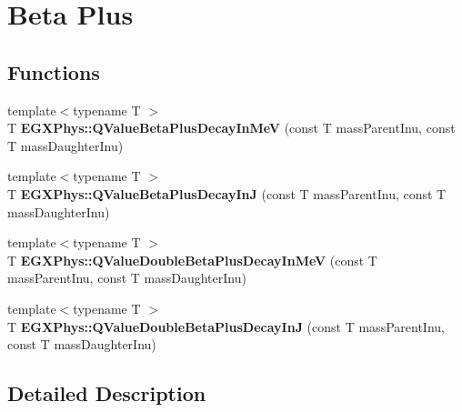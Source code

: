 \hypertarget{group___e_g_x_phys-_q_value-_beta_plus}{}\section{Beta Plus}
\label{group___e_g_x_phys-_q_value-_beta_plus}
\subsection*{Functions}
\begin{DoxyCompactItemize}
\item 
\mbox{\label{group___e_g_x_phys-_q_value-_beta_plus_ga3c4f7ec8e7c44d01d3aee6447a5ab443}} 
{\footnotesize template$<$typename T $>$ }\\T {\bfseries E\+G\+X\+Phys\+::\+Q\+Value\+Beta\+Plus\+Decay\+In\+MeV} (const T mass\+Parent\+Inu, const T mass\+Daughter\+Inu)
\item 
\mbox{\label{group___e_g_x_phys-_q_value-_beta_plus_gaaee51753f077c9fe05188aa5b24f642e}} 
{\footnotesize template$<$typename T $>$ }\\T {\bfseries E\+G\+X\+Phys\+::\+Q\+Value\+Beta\+Plus\+Decay\+InJ} (const T mass\+Parent\+Inu, const T mass\+Daughter\+Inu)
\item 
\mbox{\label{group___e_g_x_phys-_q_value-_beta_plus_gab78be314eac63ddbce441b4c8b22b47d}} 
{\footnotesize template$<$typename T $>$ }\\T {\bfseries E\+G\+X\+Phys\+::\+Q\+Value\+Double\+Beta\+Plus\+Decay\+In\+MeV} (const T mass\+Parent\+Inu, const T mass\+Daughter\+Inu)
\item 
\mbox{\label{group___e_g_x_phys-_q_value-_beta_plus_ga3531ffda0c561a601a61f54f5c7780df}} 
{\footnotesize template$<$typename T $>$ }\\T {\bfseries E\+G\+X\+Phys\+::\+Q\+Value\+Double\+Beta\+Plus\+Decay\+InJ} (const T mass\+Parent\+Inu, const T mass\+Daughter\+Inu)
\end{DoxyCompactItemize}


\subsection{Detailed Description}
